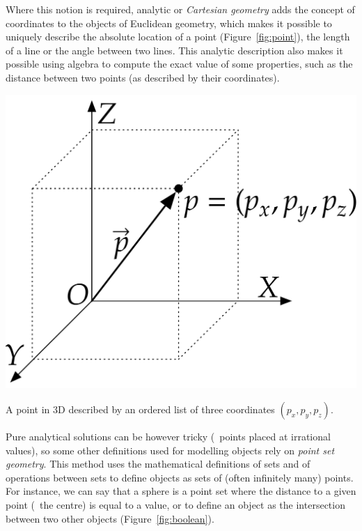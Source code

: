 \begin{description}
Where this notion is required, analytic or \emph{Cartesian geometry} adds the concept of coordinates to the objects of Euclidean geometry, which makes it possible to uniquely describe the absolute location of a point (Figure~\ref{fig:point}), the length of a line or the angle between two lines.
This analytic description also makes it possible using algebra to compute the exact value of some properties, such as the distance between two points (as described by their coordinates).

\begin{marginfigure}
\centering
\includegraphics[width=\linewidth]{figs/point.pdf}
\caption{A point in 3D described by an ordered list of three coordinates $(p_x,p_y,p_z)$.}%
\label{fig:point}
\end{marginfigure}

Pure analytical solutions can be however tricky (\eg\ points placed at irrational values), so some other definitions used for modelling objects rely on \emph{point set geometry}.
This method uses the mathematical definitions of sets and of operations between sets to define objects as sets of (often infinitely many) points.
For instance, we can say that a sphere is a point set where the distance to a given point (\ie\ the centre) is equal to a value, or to define an object as the intersection between two other objects (Figure~\ref{fig:boolean}).


\end{description}
